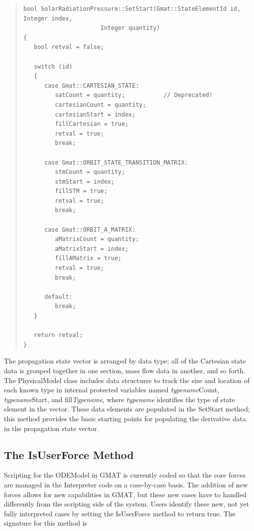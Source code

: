 \documentclass[letterpaper,10pt]{article}
\begin{document}
\begin{quote}
\begin{verbatim}
bool SolarRadiationPressure::SetStart(Gmat::StateElementId id, Integer index, 
                      Integer quantity)
{
   bool retval = false;
   
   switch (id)
   {
      case Gmat::CARTESIAN_STATE:
         satCount = quantity;           // Deprecated!
         cartesianCount = quantity;
         cartesianStart = index;
         fillCartesian = true;
         retval = true;
         break;
         
      case Gmat::ORBIT_STATE_TRANSITION_MATRIX:
         stmCount = quantity;
         stmStart = index;
         fillSTM = true;
         retval = true;
         break;
         
      case Gmat::ORBIT_A_MATRIX:
         aMatrixCount = quantity;
         aMatrixStart = index;
         fillAMatrix = true;
         retval = true;
         break;

      default:
         break;
   }
   
   return retval;
}
\end{verbatim}
\end{quote}

\noindent The propagation state vector is arranged by data type; all of the
Cartesian state data is grouped together in one section, mass flow data in
another, and so forth.  The PhysicalModel class includes data structures to
track the size and location of each known type in internal protected variables
named \textit{typename}Count, \textit{typename}Start, and fill\textit{Typename},
where \textit{typename} identifies the type of state element in the vector. 
These data elements are populated in the SetStart method; this method provides
the basic starting points for populating the derivative data in the propagation
state vector.

\subsection{The IsUserForce Method}

Scripting for the ODEModel in GMAT is currently coded so that the core forces
are managed in the Interpreter code on a case-by-case basis.  The addition of
new forces allows for new capabilities in GMAT, but these new cases have to
handled differently from the scripting side of the system.  Users identify
these new, not yet fully interpreted cases by setting the IsUserForce method to
return true.  The signature for this method is
\end{document}
